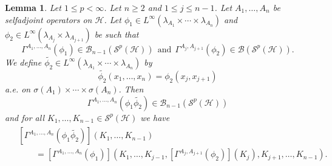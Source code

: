 \documentclass[12pt]{amsart}
\newtheorem{lemma}[theorem]{Lemma}
\theoremstyle{remark}
\begin{document}
\begin{lemma}\label{simplification1}
Let $1 \leq p < \infty$. Let $n \geq 2$ and $1\leq j \leq n-1$. Let $A_1, \ldots, A_n$ be selfadjoint operators on $\mathcal{H}$. Let $\phi_1 \in L^{\infty}(\lambda_{A_1} \times \cdots \times \lambda_{A_n})$ and $\phi_2 \in L^{\infty}(\lambda_{A_j} \times \lambda_{A_{j+1}})$ be such that
$$
\Gamma^{A_1, \ldots, A_n}(\phi_1) \in \mathcal{B}_{n-1}(\mathcal{S}^p(\mathcal{H})) \ \
\text{and} \ \
\Gamma^{A_j, A_{j+1}}(\phi_2) \in \mathcal{B}(\mathcal{S}^p(\mathcal{H})).
$$
We define $\widetilde{\phi_2} \in L^{\infty}(\lambda_{A_1} \times \cdots \times \lambda_{A_n})$ by
\begin{equation}\label{fortilde}
\widetilde{\phi_2}(x_1, \ldots, x_n) = \phi_2(x_j, x_{j+1})
\end{equation}
a.e. on $\sigma(A_1) \times \cdots \times \sigma(A_n)$.
Then
$$
\Gamma^{A_1, \ldots, A_n}(\phi_1 \widetilde{\phi_2}) \in \mathcal{B}_{n-1}(\mathcal{S}^p(\mathcal{H}))
$$
and for all $K_1, \ldots, K_{n-1} \in \mathcal{S}^p(\mathcal{H})$ we have
\begin{align}\label{fortildeeq}
\begin{split}
& \left[ \Gamma^{A_1, \ldots, A_n}(\phi_1 \widetilde{\phi_2})\right] (K_1, \ldots, K_{n-1}) \\
& \ \ \ \ \ \ \ \ \ = \left[ \Gamma^{A_1, \ldots, A_n}(\phi_1)\right] \left(K_1, \ldots, K_{j-1}, \left[\Gamma^{A_j, A_{j+1}}(\phi_2)\right](K_j), K_{j+1}, \ldots, K_{n-1}\right).
\end{split}
\end{align}
\end{lemma}
\end{document}
